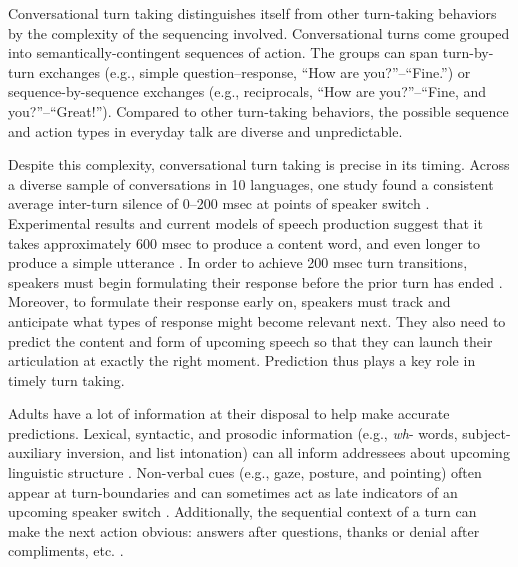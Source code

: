 \documentclass[authoryear, 12pt]{elsarticle}
\begin{document}
Conversational turn taking distinguishes itself from other turn-taking behaviors by the complexity of the sequencing involved. Conversational turns come grouped into semantically-contingent sequences of action. The groups can span turn-by-turn exchanges (e.g., simple question--response, ``How are you?''--``Fine.'') or sequence-by-sequence exchanges (e.g., reciprocals, ``How are you?''--``Fine, and you?''--``Great!''). Compared to other turn-taking behaviors, the possible sequence and action types in everyday talk are diverse and unpredictable.


Despite this complexity, conversational turn taking is precise in its timing. Across a diverse sample of conversations in 10 languages, one study found a consistent average inter-turn silence of 0--200 msec at points of speaker switch \citep{stivers2009}. Experimental results and current models of speech production suggest that it takes approximately 600 msec to produce a content word, and even longer to produce a simple utterance \citep{griffin2000, levelt1989}. In order to achieve 200 msec turn transitions, speakers must begin formulating their response before the prior turn has ended \citep{levinson2013, levinson2016}. Moreover, to formulate their response early on, speakers must track and anticipate what types of response might become relevant next. They also need to predict the content and form of upcoming speech so that they can launch their articulation at exactly the right moment. Prediction thus plays a key role in timely turn taking.

Adults have a lot of information at their disposal to help make accurate predictions. Lexical, syntactic, and prosodic information (e.g., \textit{wh}- words, subject-auxiliary inversion, and list intonation) can all inform addressees about upcoming linguistic structure \citep{de-ruiter2006, duncan1972, ford1996, torreira2015}. Non-verbal cues (e.g., gaze, posture, and pointing) often appear at turn-boundaries and can sometimes act as late indicators of an upcoming speaker switch \citep{rossano2009, stivers2010}. Additionally, the sequential context of a turn can make the next action obvious: answers after questions, thanks or denial after compliments, etc. \citep{schegloff2007}.
\end{document}
